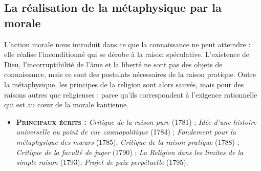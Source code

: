 \subsection{La réalisation de la métaphysique par
la morale}

L'action morale nous introduit dans ce
que la connaissance ne peut atteindre :
elle réalise l’inconditionné qui se dérobe
à la raison spéculative. L'existence de
Dieu, l’incorruptibilité de l’âme et la
liberté ne sont pas des objets de
connaissance, mais ce sont des postulats
nécessaires de la raison pratique. Outre
la métaphysique, les principes de la religion
sont alors sauvés, mais pour des
raisons autres que religieuses : parce
qu'ils correspondent à l'exigence rationnelle
qui est au cœur de la morale kantienne.

\begin{itemize}[leftmargin=1cm, label=, itemsep=1pt]
\item {\bf \textsc{Principaux écrits} :} {\it Critique de la
raison pure} (1781) ; {\it Idée d'une histoire
universelle au point de vue
cosmopolitique} (1784) ; {\it Fondement
pour la métaphysique des mœurs}
(1785); {\it Critique de la raison pratique}
(1788) ; {\it Critique de la faculté
de juger} (1790) ; {\it La Religion dans
les limites de la simple raison}
(1793); {\it Projet de paix perpétuelle}
(1795).
\end{itemize}

